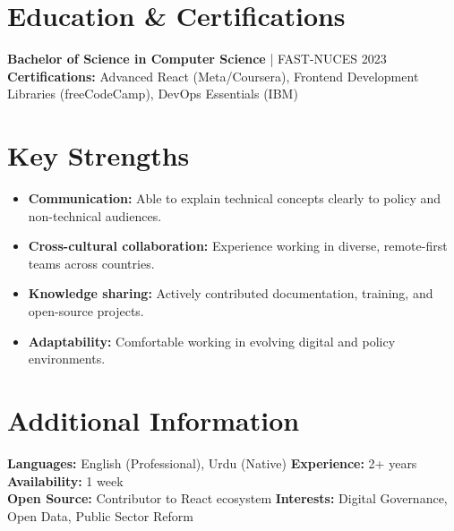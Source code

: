 \documentclass[10pt]{article}
\begin{document}
\section{Education \& Certifications}
\textbf{Bachelor of Science in Computer Science} | FAST-NUCES \hfill 2023 \\[2pt]
\textbf{Certifications:} Advanced React (Meta/Coursera), Frontend Development Libraries (freeCodeCamp), DevOps Essentials (IBM)

\section{Key Strengths}
\begin{itemize}
\item \textbf{Communication:} Able to explain technical concepts clearly to policy and non-technical audiences.
\item \textbf{Cross-cultural collaboration:} Experience working in diverse, remote-first teams across countries.
\item \textbf{Knowledge sharing:} Actively contributed documentation, training, and open-source projects.
\item \textbf{Adaptability:} Comfortable working in evolving digital and policy environments.
\end{itemize}

\section{Additional Information}
\textbf{Languages:} English (Professional), Urdu (Native) \quad \textbf{Experience:} 2+ years \quad \textbf{Availability:} 1 week \\ 
\textbf{Open Source:} Contributor to React ecosystem \quad \textbf{Interests:} Digital Governance, Open Data, Public Sector Reform
\end{document}
